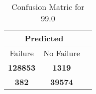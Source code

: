 \begin{table}[] 
\caption{Confusion Matric for 99.0} 
\label{Table: Prediction Accuracy-DMD99.0OnlySunEKF-resetReflection-Reflection} 
\centering 
\begin{tabular} 
 {@{}ccc@{}} 
\toprule 
\multicolumn{2}{c}{\textbf{Predicted}}
 \\ \midrule 
\multicolumn{1}{|c|}{Failure} & 
\multicolumn{1}{c|}{No Failure}
 \\ \midrule 
\multicolumn{1}{|c|}{\color{green}\textbf{128853}} & 
\multicolumn{1}{c|}{\color{red}\textbf{1319}}
 \\ \midrule 
\multicolumn{1}{|c|}{\color{red}\textbf{382}} & 
\multicolumn{1}{c|}{\color{green}\textbf{39574}}
 \\ \bottomrule 
\end{tabular} 
\end{table} 
